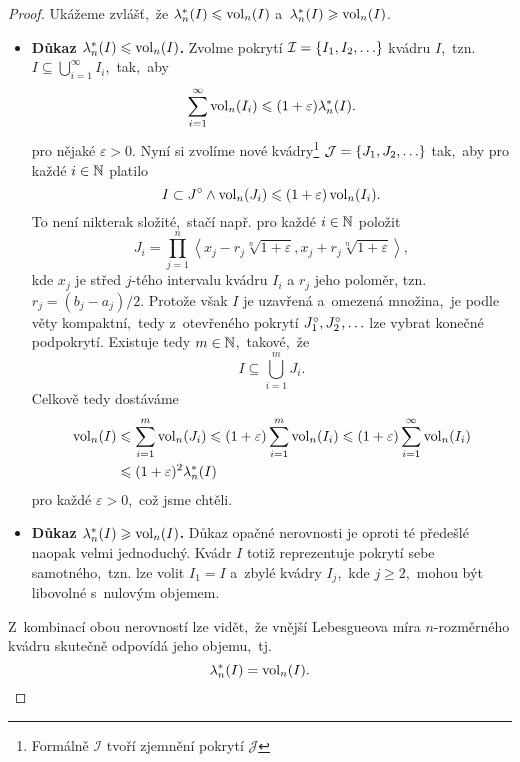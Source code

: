 \begin{proof}
    Ukážeme zvlášť,~že $\lambda_n^*(I)\leqslant\operatorname{vol}_n(I)$ a~$\lambda_n^*(I)\geqslant\operatorname{vol}_n(I)$.
    \begin{itemize}
        \item \textbf{Důkaz $\lambda_n^*(I)\leqslant\operatorname{vol}_n(I)$.} Zvolme pokrytí $\mathcal{I}=\left\{I_1,I_2,\ldots\right\}$ kvádru $I$,~tzn. $I\subseteq\bigcup_{i=1}^\infty I_i$,~tak,~aby
        \[\sum_{i=1}^{\infty}\operatorname{vol}_n(I_i)\leqslant(1+\varepsilon)\lambda_n^*(I).\]
        pro nějaké $\varepsilon>0$. Nyní si zvolíme nové kvádry\footnote{Formálně $\mathcal{I}$ tvoří zjemnění pokrytí $\mathcal{J}$} $\mathcal{J}=\left\{J_1,J_2,\ldots\right\}$ tak,~aby pro každé $i\in\mathbb{N}$ platilo
        \[I\subset J^\circ\land\operatorname{vol}_n(J_i)\leqslant(1+\varepsilon)\operatorname{vol}_n(I_i).\]
        To není nikterak složité,~stačí např. pro každé $i\in\mathbb{N}$ položit
        \[J_i=\prod_{j=1}^{n}\left\langle x_j-r_j\sqrt[n]{1+\varepsilon},x_j+r_j\sqrt[n]{1+\varepsilon}\right\rangle,\]
        kde $x_j$ je střed $j$-tého intervalu kvádru $I_i$ a $r_j$ jeho poloměr, tzn. $r_j=(b_j-a_j)/2$. Protože však $I$ je uzavřená a~omezená množina,~je podle věty  kompaktní,~tedy z~otevřeného pokrytí $J_1^\circ,J_2^\circ,\ldots$ lze vybrat konečné podpokrytí. Existuje tedy $m\in\mathbb{N}$,~takové,~že
        \[I\subseteq\bigcup_{i=1}^m J_i.\]
        Celkově tedy dostáváme
        \begin{align*}
            \operatorname{vol}_n(I)&\leqslant\sum_{i=1}^{m}\operatorname{vol}_n(J_i)\leqslant(1+\varepsilon)\sum_{i=1}^{m}\operatorname{vol}_n(I_i)\leqslant(1+\varepsilon)\sum_{i=1}^{\infty}\operatorname{vol}_n(I_i)\\
            &\leqslant (1+\varepsilon)^2\lambda_n^*(I)
        \end{align*}
        pro každé $\varepsilon>0$,~což jsme chtěli.
        \item \textbf{Důkaz $\lambda_n^*(I)\geqslant\operatorname{vol}_n(I)$.} Důkaz opačné nerovnosti je oproti té předešlé naopak velmi jednoduchý. Kvádr $I$ totiž reprezentuje pokrytí sebe samotného,~tzn. lze volit $I_1=I$ a~zbylé kvádry $I_j$,~kde $j\geqslant 2$,~mohou být libovolné s~nulovým objemem.
    \end{itemize}
    Z~kombinací obou nerovností lze vidět,~že vnější Lebesgueova míra $n$-rozměrného kvádru skutečně odpovídá jeho objemu,~tj.
    \[\lambda_n^*(I)=\operatorname{vol}_n(I).\]
\end{proof}
